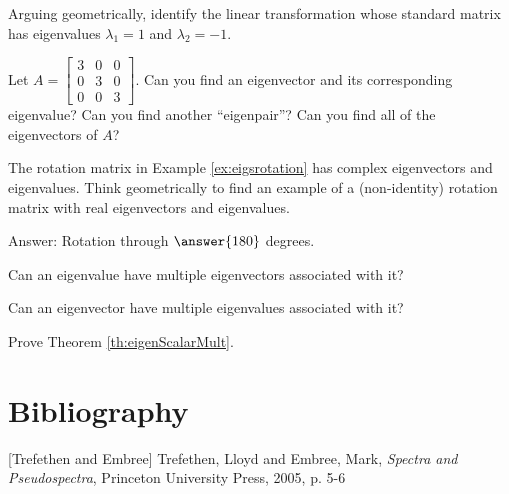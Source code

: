 \documentclass{ximera}
\begin{document}
\begin{problem}\label{prob:eigenvalgeometry}
Arguing geometrically, identify the linear transformation whose standard matrix has eigenvalues $\lambda_1=1$ and $\lambda_2=-1$.
\begin{multipleChoice}
  \end{multipleChoice}
\end{problem}

\begin{problem}\label{prob:eigvalvectorsofdiagmat} Let $A=\begin{bmatrix} 3&0&0\\0&3&0\\0&0&3\end{bmatrix}$.  Can you find an eigenvector and its corresponding eigenvalue?  Can you find another ``eigenpair''?  Can you find all of the eigenvectors of $A$?
\end{problem}

\begin{problem}\label{prob:rotmatrixrealeig1}The rotation matrix in Example \ref{ex:eigsrotation} has complex eigenvectors and eigenvalues.  Think geometrically to find an example of a (non-identity) rotation matrix with real eigenvectors and eigenvalues.

Answer:  Rotation through $\answer{180}$ degrees.
\end{problem}

\begin{problem}\label{prob:eigenmultchoice}
Can an eigenvalue have multiple eigenvectors associated with it? 
\begin{multipleChoice}
    \end{multipleChoice}
    
 Can an eigenvector have multiple eigenvalues associated with it?
 \begin{multipleChoice}
    \end{multipleChoice}
\end{problem}

\begin{problem}\label{prob:prob:eigenScalarMult}
    Prove Theorem \ref{th:eigenScalarMult}.
\end{problem}

\section*{Bibliography}
[Trefethen and  Embree] Trefethen, Lloyd and Embree, Mark, {\it Spectra and Pseudospectra}, Princeton University Press, 2005, p. 5-6
\end{document}
